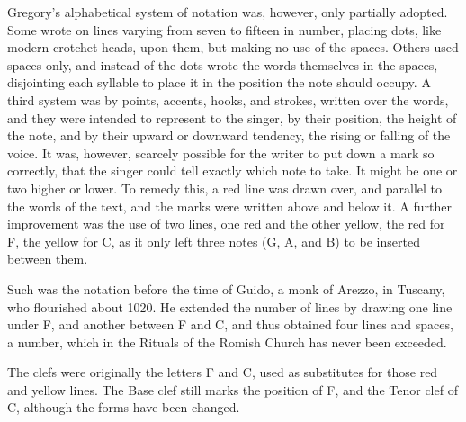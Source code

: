 Gregory’s alphabetical system of notation was, however, only partially adopted.
Some wrote on lines varying from seven to fifteen in number, placing dots, like
modern crotchet-heads, upon them, but making no use of the spaces. Others used
spaces only, and instead of the dots wrote the words themselves in the spaces, disjointing
each syllable to place it in the position the note should occupy. A third
system was by points, accents, hooks, and strokes, written over the words, and they
were intended to represent to the singer, by their position, the height of the note,
and by their upward or downward tendency, the rising or falling of the voice. It
was, however, scarcely possible for the writer to put down a mark so correctly,
that the singer could tell exactly which note to take. It might be one or two
higher or lower. To remedy this, a red line was drawn over, and parallel to the
words of the text, and the marks were written above and below it. A further
improvement was the use of two lines, one red and the other yellow, the red for F,
the yellow for C, as it only left three notes (G, A, and B) to be inserted between
them.

Such was the notation before the time of Guido, a monk of Arezzo, in Tuscany,
who flourished about 1020. He extended the number of lines by drawing one
line under F, and another between F and C, and thus obtained four lines and
spaces, a number, which in the Rituals of the Romish Church has never been
exceeded.

The clefs were originally the letters F and C, used as substitutes for those red
and yellow lines. The Base clef still marks the position of F, and the Tenor
clef of C, although the forms have been changed.

